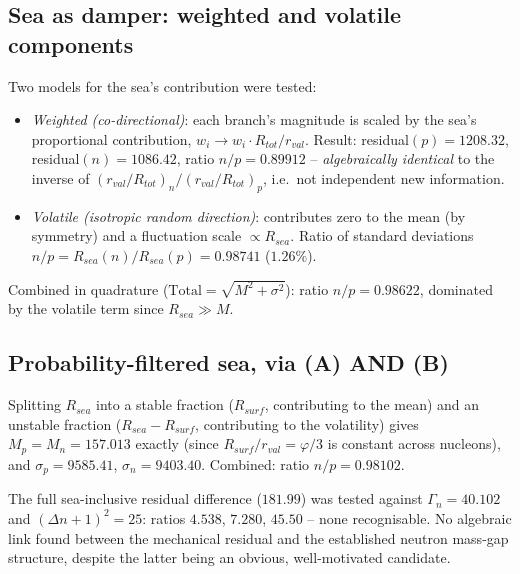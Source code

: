 \documentclass[11pt]{article}
\def\texorpdfstring#1#2{#2}%
\begin{document}
\subsection{Sea as damper: weighted and volatile components}
Two models for the sea's contribution were tested:
\begin{itemize}
\item \emph{Weighted (co-directional)}: each branch's magnitude is scaled by the sea's proportional contribution, $w_i\to w_i\cdot R_{tot}/r_{val}$. Result: residual$(p)=1208.32$, residual$(n)=1086.42$, ratio $n/p=0.89912$ -- \emph{algebraically identical} to the inverse of $(r_{val}/R_{tot})_n/(r_{val}/R_{tot})_p$, i.e.\ not independent new information.
\item \emph{Volatile (isotropic random direction)}: contributes zero to the mean (by symmetry) and a fluctuation scale $\propto R_{sea}$. Ratio of standard deviations $n/p = R_{sea}(n)/R_{sea}(p) = 0.98741$ ($1.26\%$).
\end{itemize}
Combined in quadrature ($\mathrm{Total}=\sqrt{M^2+\sigma^2}$): ratio $n/p=0.98622$, dominated by the volatile term since $R_{sea}\gg M$.

\subsection{Probability-filtered sea, via \texorpdfstring{$(A)\wedge(B)$}{(A) AND (B)}}
Splitting $R_{sea}$ into a stable fraction ($R_{surf}$, contributing to the mean) and an unstable fraction ($R_{sea}-R_{surf}$, contributing to the volatility) gives $M_p=M_n=157.013$ exactly (since $R_{surf}/r_{val}=\varphi/3$ is constant across nucleons), and $\sigma_p=9585.41$, $\sigma_n=9403.40$. Combined: ratio $n/p=0.98102$.

\begin{negativebox}
The full sea-inclusive residual difference ($181.99$) was tested against $\Gamma_n=40.102$ \citep{D22} and $(\Delta n+1)^2=25$: ratios $4.538$, $7.280$, $45.50$ -- none recognisable. No algebraic link found between the mechanical residual and the established neutron mass-gap structure, despite the latter being an obvious, well-motivated candidate.
\end{negativebox}
\end{document}
